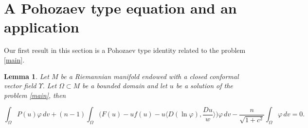 \documentclass[12pt]{amsart}
\theoremstyle{plain}
\newtheorem{lemma}{\bf Lemma}
\numberwithin{equation}{section}
\begin{document}
\section{A Pohozaev type equation and an application}\label{PTE}

Our first result in this section is a Pohozaev type identity related to the problem \eqref{main}.

\begin{lemma}\label{Lemma pohozaev}
    Let $M$ be a Riemannian manifold endowed with a closed conformal vector field $\Upsilon$. Let $\Omega\subset M$ be a bounded domain and let $u$ be a solution of the problem \eqref{main}, then  

\[
\int_\Omega P(u)\varphi\, dv + (n-1)\int_\Omega\Big(F(u) - uf(u) - u\Big\langle D(\ln\varphi), \frac{Du}{w}\Big\rangle\Big)\varphi\, dv -\frac{n}{\sqrt{1+c^2}}\int_\Omega\varphi\, dv=0.
\]
\end{lemma}
\end{document}
